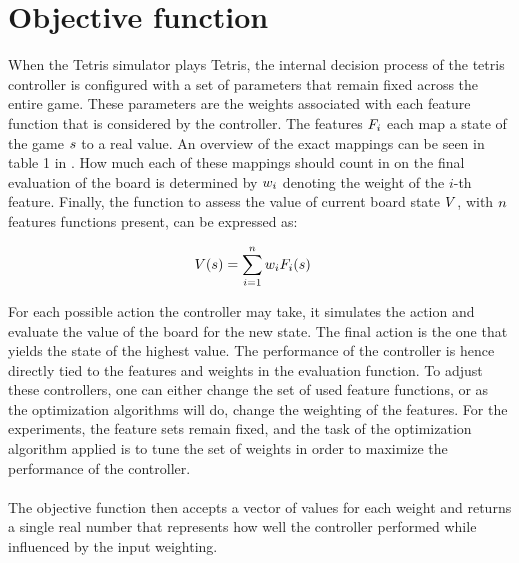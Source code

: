 \section{Objective function}

When the Tetris simulator plays Tetris, the internal decision process
of the tetris controller is configured with a set of parameters that remain
fixed across the entire game. These parameters are the weights associated 
with each feature function that is considered by the controller. The features $F _{i}$
each map a state of the game $s$ to a real value. An overview of the exact mappings
can be seen in table 1 in \citep{scherrer2009:b}. How much each of these mappings
should count in on the final evaluation of the board is determined by $w _{i}$
denoting the weight of the $i$-th feature. Finally, the function to assess the value 
of current board state $V$, with $n$ features functions present, can be expressed as:

\begin{align*}
V (s ) &= \sum_{i=1}^{n} w _{i}F _{i}(s )
\end{align*}

For each possible action the controller may take, it simulates 
the action and evaluate the value of the board for the new state. 
The final action is the one that yields the state of the highest value.
The performance of the controller is hence directly tied to the 
features and weights in the evaluation function. To adjust these controllers,
one can either change the set of used feature functions, or as the 
optimization algorithms will do, change the weighting of the features.
For the experiments, the feature sets remain fixed, and the task of the
optimization algorithm applied is to tune the set of weights in order 
to maximize the performance of the controller.\\
\\
The objective function then accepts a vector of values for each weight
and returns a single real number that represents how well the controller
performed while influenced by the input weighting.


